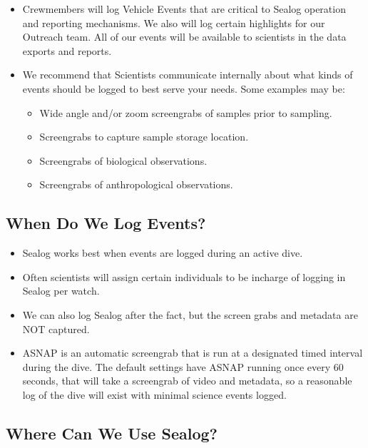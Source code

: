 \documentclass[
  letterpaper,
  DIV=11,
  numbers=noendperiod]{scrreprt}
\providecommand{\tightlist}{%
  \setlength{\itemsep}{0pt}\setlength{\parskip}{0pt}}\usepackage{longtable,booktabs,array}
\begin{document}
\begin{itemize}
\tightlist
\item
  Crewmembers will log Vehicle Events that are critical to Sealog
  operation and reporting mechanisms. We also will log certain
  highlights for our Outreach team. All of our events will be available
  to scientists in the data exports and reports.
\item
  We recommend that Scientists communicate internally about what kinds
  of events should be logged to best serve your needs. Some examples may
  be:

  \begin{itemize}
  \tightlist
  \item
    Wide angle and/or zoom screengrabs of samples prior to sampling.
  \item
    Screengrabs to capture sample storage location.
  \item
    Screengrabs of biological observations.
  \item
    Screengrabs of anthropological observations.
  \end{itemize}
\end{itemize}

\hypertarget{when-do-we-log-events}{%
\subsection{When Do We Log Events?}\label{when-do-we-log-events}}

\begin{itemize}
\tightlist
\item
  Sealog works best when events are logged during an active dive.
\item
  Often scientists will assign certain individuals to be incharge of
  logging in Sealog per watch.
\item
  We can also log Sealog after the fact, but the screen grabs and
  metadata are NOT captured.
\item
  ASNAP is an automatic screengrab that is run at a designated timed
  interval during the dive. The default settings have ASNAP running once
  every 60 seconds, that will take a screengrab of video and metadata,
  so a reasonable log of the dive will exist with minimal science events
  logged.
\end{itemize}

\hypertarget{where-can-we-use-sealog}{%
\subsection{Where Can We Use Sealog?}\label{where-can-we-use-sealog}}
\end{document}
